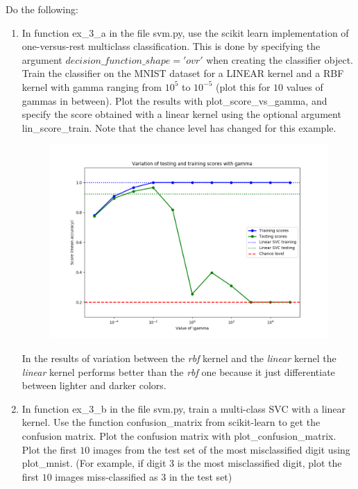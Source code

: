 \documentclass[a4paper]{article}
\begin{document}
Do the following:
\begin{enumerate}[label=(\alph*)]
\item In function ex\_3\_a in the file svm.py, use the scikit learn implementation of one-versus-rest multiclass classification. This is done by specifying the argument $decision\_function\_shape='ovr'$ when creating the classifier object. Train the classifier on the MNIST dataset for a LINEAR kernel and a RBF kernel with gamma ranging from $10^5$ to $10^{−5}$ (plot this for $10$ values of gammas in between). Plot the results with plot\_score\_vs\_gamma, and specify the score obtained with a linear kernel using the optional argument lin\_score\_train. Note that the chance level has changed for this example.

\begin{figure}[htp]
\centering
  \includegraphics[scale=0.38]{plots/ex3a.png}
  \label{fig:15}
\end{figure}

In the results of variation between the \textit{rbf} kernel and the \textit{linear} kernel the \textit{linear} kernel performs better than the \textit{rbf} one because it just differentiate between lighter and darker colors.

\newpage

\item In function ex\_3\_b in the file svm.py, train a multi-class SVC with a linear kernel. Use the function confusion\_matrix from scikit-learn to get the confusion matrix. Plot the confusion matrix with plot\_confusion\_matrix. Plot the first $10$ images from the test set of the most misclassified digit using plot\_mnist. (For example, if digit 3 is the most misclassified digit, plot the first $10$ images miss-classified as 3 in the test set)


\end{enumerate}
\end{document}
